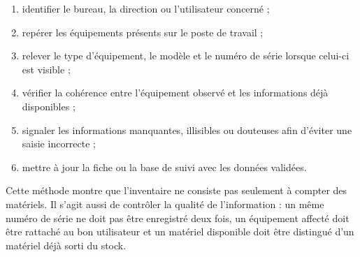 \documentclass[12pt,a4paper]{report}
\begin{document}
\begin{enumerate}[label=\arabic*.]
    \item identifier le bureau, la direction ou l'utilisateur concerné ;
    \item repérer les équipements présents sur le poste de travail ;
    \item relever le type d'équipement, le modèle et le numéro de série lorsque celui-ci est visible ;
    \item vérifier la cohérence entre l'équipement observé et les informations déjà disponibles ;
    \item signaler les informations manquantes, illisibles ou douteuses afin d'éviter une saisie incorrecte ;
    \item mettre à jour la fiche ou la base de suivi avec les données validées.
\end{enumerate}

Cette méthode montre que l'inventaire ne consiste pas seulement à compter des matériels. Il s'agit aussi de contrôler la qualité de l'information : un même numéro de série ne doit pas être enregistré deux fois, un équipement affecté doit être rattaché au bon utilisateur et un matériel disponible doit être distingué d'un matériel déjà sorti du stock.
\end{document}
